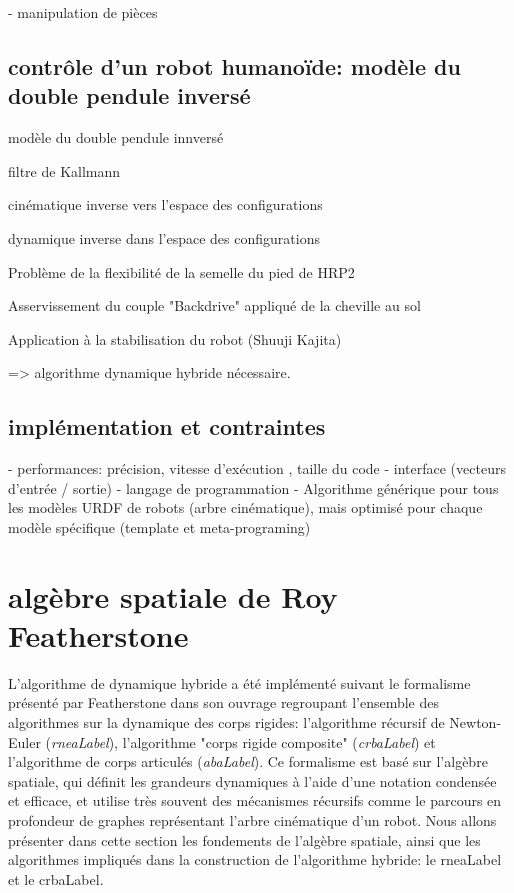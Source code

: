 \documentclass{report}
\begin{document}
	- manipulation de pièces


\section{contrôle d'un robot humanoïde: modèle du double pendule inversé}

modèle du double pendule innversé

filtre de Kallmann

cinématique inverse vers l'espace des configurations

dynamique inverse dans l'espace des configurations

Problème de la flexibilité de la semelle du pied de HRP2

Asservissement du couple "Backdrive" appliqué de la cheville au sol

Application à la stabilisation du robot (Shuuji Kajita)

=> algorithme dynamique hybride nécessaire.

\section{implémentation et contraintes}
- performances: précision, vitesse d'exécution , taille du code\vspace{0.3cm}
- interface (vecteurs d'entrée / sortie)\vspace{0.3cm}
- langage de programmation\vspace{0.3cm}
- Algorithme générique pour tous les modèles URDF de robots (arbre cinématique), mais optimisé pour chaque modèle spécifique (template et meta-programing)\vspace{0.3cm}



\chapter{algèbre spatiale de Roy Featherstone}
L'algorithme de dynamique hybride a été implémenté suivant le formalisme présenté par Featherstone dans son ouvrage \cite{Featherstone} regroupant l'ensemble des algorithmes sur la dynamique des corps rigides: l'algorithme récursif de Newton-Euler (\emph{\gls{rneaLabel}}), l'algorithme "corps rigide composite" (\emph{\gls{crbaLabel}}) et l'algorithme de corps articulés (\emph{\gls{abaLabel}}). Ce formalisme est basé sur l'algèbre spatiale, qui définit les grandeurs dynamiques à l'aide d'une notation condensée et efficace, et utilise très souvent des mécanismes récursifs comme le parcours en profondeur de graphes représentant l'arbre cinématique d'un robot. Nous allons présenter dans cette section les fondements de l'algèbre spatiale, ainsi que les algorithmes impliqués dans la construction de l'algorithme hybride: le \gls{rneaLabel} et le \gls{crbaLabel}.\\
\end{document}

